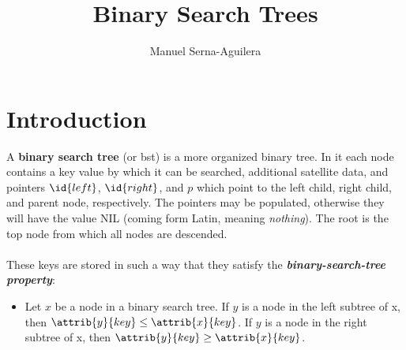 \documentclass{article}
\title{Binary Search Trees}
\author{Manuel Serna-Aguilera}
\date{}
\begin{document}
\maketitle

\section*{Introduction}
A \textbf{binary search tree} (or bst) is a more organized binary tree. In it each node contains a key value by which it can be searched, additional satellite data, and pointers $\id{left}$, $\id{right}$, and $p$ which point to the left child, right child, and parent node, respectively. The pointers may be populated, otherwise they will have the value NIL (coming form Latin, meaning \textit{nothing}). The root is the top node from which all nodes are descended. 
\\ \\
These keys are stored in such a way that they satisfy the \textbf{\emph{binary-search-tree property}}:

\begin{itemize}
    \item[] Let $x$ be a node in a binary search tree. If $y$ is a node in the left subtree of x, then $\attrib{y}{key} \leq \attrib{x}{key}$. If $y$ is a node in the right subtree of x, then $\attrib{y}{key} \geq \attrib{x}{key}$.
\end{itemize}
\end{document}
